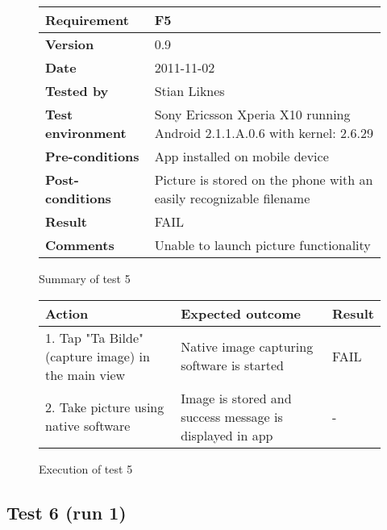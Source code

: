 	\begin{figure}[htb]
		\centering
		\begin{tabular}{|p{3.5cm}|p{7.0cm}|} \hline
			\textbf{Requirement} & F5 \\ \hline
			\textbf{Version} & 0.9 \\ \hline
			\textbf{Date} & 2011-11-02 \\ \hline
			\textbf{Tested by} & Stian Liknes \\ \hline
			\textbf{Test environment} & Sony Ericsson Xperia X10 running Android 2.1.1.A.0.6 with kernel: 2.6.29 \\ \hline
			\textbf{Pre-conditions} & App installed on mobile device \\ \hline
			\textbf{Post-conditions} & Picture is stored on the phone with an easily recognizable filename \\ \hline
			\textbf{Result} & FAIL \\ \hline
			\textbf{Comments} & Unable to launch picture functionality \\ \hline
		\end{tabular}
		\caption{Summary of test 5}
	\end{figure}

	\begin{figure}[htb]
		\centering
		\begin{tabular}{|p{5.0cm}|p{5.0cm}|p{1cm}|}
			\hline \textbf{Action} & \textbf{Expected outcome} & \textbf{Result} \\ \hline
			1. Tap "Ta Bilde" (capture image) in the main view &
			Native image capturing software is started & 
			FAIL \\ \hline

			2. Take picture using native software &
			Image is stored and success message is displayed in app &
			-\\ \hline
		\end{tabular}
		\caption{Execution of test 5}
	\end{figure}

\newpage
\subsection*{Test 6 (run 1)}

